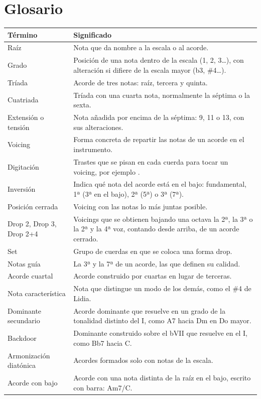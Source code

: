 \documentclass[a4paper,11pt,oneside]{report}
\newcounter{none}
\let\originaltexttt\texttt
\renewcommand{\texttt}[1]{\originaltexttt{\seqsplit{#1}}}
\begin{document}
\chapter{Glosario}\label{glosario}

{\def\LTcaptype{none} %
\begin{longtable}[]{@{}>{\raggedright\arraybackslash}p{}>{\raggedright\arraybackslash}p{}@{}}
\toprule\noalign{}
Término & Significado \\
\midrule\noalign{}
\endhead
\bottomrule\noalign{}
\endlastfoot
Raíz & Nota que da nombre a la escala o al acorde. \\
Grado & Posición de una nota dentro de la escala (1, 2, 3\ldots), con alteración si difiere de la escala mayor (b3, \#4\ldots). \\
Tríada & Acorde de tres notas: raíz, tercera y quinta. \\
Cuatriada & Tríada con una cuarta nota, normalmente la séptima o la sexta. \\
Extensión o tensión & Nota añadida por encima de la séptima: 9, 11 o 13, con sus alteraciones. \\
Voicing & Forma concreta de repartir las notas de un acorde en el instrumento. \\
Digitación & Trastes que se pisan en cada cuerda para tocar un voicing, por ejemplo \texttt{x7958x}. \\
Inversión & Indica qué nota del acorde está en el bajo: fundamental, 1ª (3ª en el bajo), 2ª (5ª) o 3ª (7ª). \\
Posición cerrada & Voicing con las notas lo más juntas posible. \\
Drop 2, Drop 3, Drop 2+4 & Voicings que se obtienen bajando una octava la 2ª, la 3ª o la 2ª y la 4ª voz, contando desde arriba, de un acorde cerrado. \\
Set & Grupo de cuerdas en que se coloca una forma drop. \\
Notas guía & La 3ª y la 7ª de un acorde, las que definen su calidad. \\
Acorde cuartal & Acorde construido por cuartas en lugar de terceras. \\
Nota característica & Nota que distingue un modo de los demás, como el \#4 de Lidia. \\
Dominante secundario & Acorde dominante que resuelve en un grado de la tonalidad distinto del I, como A7 hacia Dm en Do mayor. \\
Backdoor & Dominante construido sobre el bVII que resuelve en el I, como Bb7 hacia C. \\
Armonización diatónica & Acordes formados solo con notas de la escala. \\
Acorde con bajo & Acorde con una nota distinta de la raíz en el bajo, escrito con barra: Am7/C. \\
\end{longtable}
}
\end{document}
